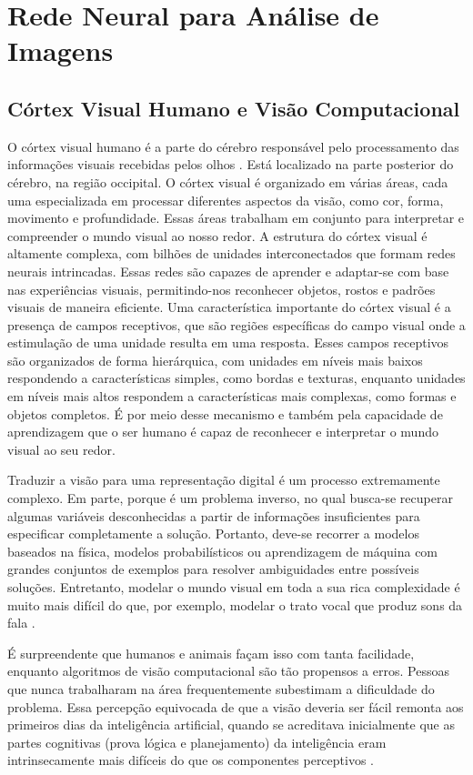 \section{Rede Neural para Análise de Imagens}
\subsection{Córtex Visual Humano e Visão Computacional}
\label{CoViHu}
O córtex visual humano é a parte do cérebro responsável pelo processamento das informações visuais recebidas pelos olhos \cite{FisioHumana}. Está localizado na parte posterior do cérebro, na região occipital. O córtex visual é organizado em várias áreas, cada uma especializada em processar diferentes aspectos da visão, como cor, forma, movimento e profundidade. Essas áreas trabalham em conjunto para interpretar e compreender o mundo visual ao nosso redor. A estrutura do córtex visual é altamente complexa, com bilhões de unidades interconectados que formam redes neurais intrincadas. Essas redes são capazes de aprender e adaptar-se com base nas experiências visuais, permitindo-nos reconhecer objetos, rostos e padrões visuais de maneira eficiente. Uma característica importante do córtex visual é a presença de campos receptivos, que são regiões específicas do campo visual onde a estimulação de uma unidade resulta em uma resposta. Esses campos receptivos são organizados de forma hierárquica, com unidades em níveis mais baixos respondendo a características simples, como bordas e texturas, enquanto unidades em níveis mais altos respondem a características mais complexas, como formas e objetos completos.
É por meio desse mecanismo e também pela capacidade de aprendizagem que o ser humano é capaz de reconhecer e interpretar o mundo visual ao seu redor.

Traduzir a visão para uma representação digital é um processo extremamente complexo. Em parte, porque é um problema inverso, no qual busca-se recuperar algumas variáveis desconhecidas a partir de informações insuficientes para especificar completamente a solução. Portanto, deve-se recorrer a modelos baseados na física, modelos probabilísticos ou aprendizagem de máquina com grandes conjuntos de exemplos para resolver ambiguidades entre possíveis soluções. Entretanto, modelar o mundo visual em toda a sua rica complexidade é muito mais difícil do que, por exemplo, modelar o trato vocal que produz sons da fala \cite{szeliski2010}. 

É surpreendente que humanos e animais façam isso com tanta facilidade, enquanto algoritmos de visão computacional são tão propensos a erros. Pessoas que nunca trabalharam na área frequentemente subestimam a dificuldade do problema. Essa percepção equivocada de que a visão deveria ser fácil remonta aos primeiros dias da inteligência artificial, quando se acreditava inicialmente que as partes cognitivas (prova lógica e planejamento) da inteligência eram intrinsecamente mais difíceis do que os componentes perceptivos \cite{Muller2008ReviewBoden}.

